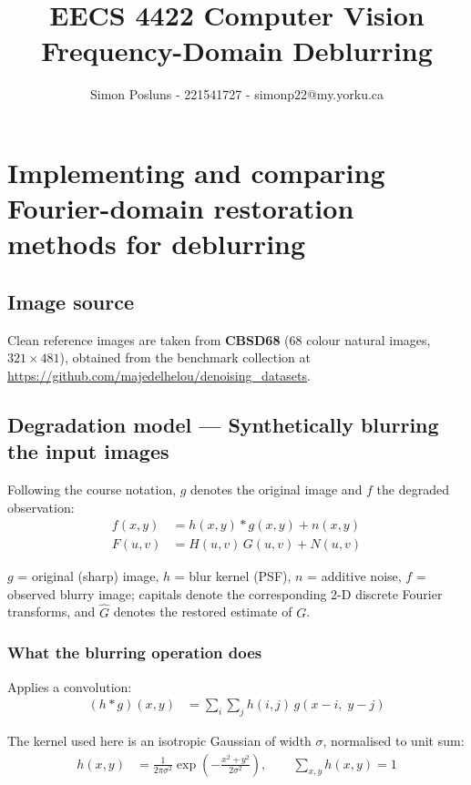\documentclass[10pt,twocolumn,letterpaper]{article}
\title{\textbf{EECS 4422 Computer Vision}\\[4pt]
       \large Frequency-Domain Deblurring}
\author{Simon Posluns - 221541727 - simonp22@my.yorku.ca}
\date{}
\begin{document}
\maketitle

\section*{Implementing and comparing Fourier-domain restoration methods for deblurring}

\subsection*{Image source}

Clean reference images are taken from \textbf{CBSD68} (68 colour natural images,
$321 \times 481$), obtained from the benchmark collection at
\url{https://github.com/majedelhelou/denoising_datasets}.

\subsection*{Degradation model — Synthetically blurring the input images}

Following the course notation, $g$ denotes the original image and $f$ the degraded
observation:
\begin{align}
  f(x,y) &= h(x,y) * g(x,y) + n(x,y) \\
  F(u,v) &= H(u,v)\,G(u,v) + N(u,v)
\end{align}

\noindent $g$ = original (sharp) image, $h$ = blur kernel (PSF), $n$ = additive noise,
$f$ = observed blurry image; capitals denote the corresponding 2-D discrete Fourier
transforms, and $\hat{G}$ denotes the restored estimate of $G$.

\subsubsection*{What the blurring operation does}

Applies a convolution:
\begin{align}
  (h * g)(x,y) &= \sum_{i}\sum_{j} h(i,j)\, g(x-i,\; y-j)
\end{align}

\noindent The kernel used here is an isotropic Gaussian of width $\sigma$, normalised to unit sum:
\begin{align}
  h(x,y) &= \frac{1}{2\pi\sigma^{2}}
            \exp\!\left(-\frac{x^{2}+y^{2}}{2\sigma^{2}}\right),
  \qquad \sum_{x,y} h(x,y) = 1
\end{align}
\end{document}
